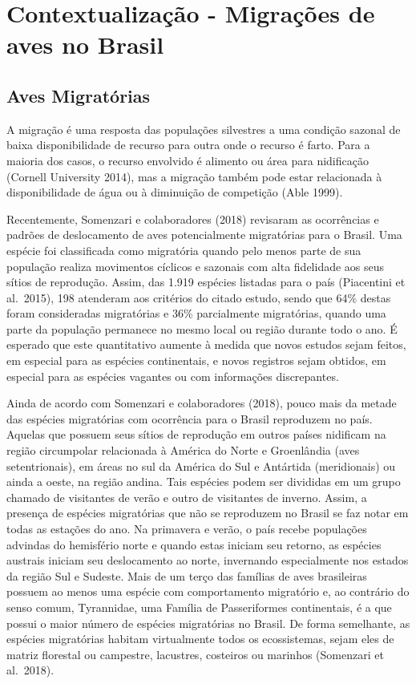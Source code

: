 \documentclass[
  oneside]{scrbook}
\begin{document}
\hypertarget{contextualizacao}{%
\section{Contextualização - Migrações de aves no Brasil}\label{contextualizacao}}

\hypertarget{aves-migratorias}{%
\subsection{Aves Migratórias}\label{aves-migratorias}}

A migração é uma resposta das populações silvestres a uma condição sazonal de baixa disponibilidade de recurso para outra onde o recurso é farto. Para a maioria dos casos, o recurso envolvido é alimento ou área para nidificação (Cornell University 2014), mas a migração também pode estar relacionada à disponibilidade de água ou à diminuição de competição (Able 1999).

Recentemente, Somenzari e colaboradores (2018) revisaram as ocorrências e padrões de deslocamento de aves potencialmente migratórias para o Brasil. Uma espécie foi classificada como migratória quando pelo menos parte de sua população realiza movimentos cíclicos e sazonais com alta fidelidade aos seus sítios de reprodução. Assim, das 1.919 espécies listadas para o país (Piacentini et al.~2015), 198 atenderam aos critérios do citado estudo, sendo que 64\% destas foram consideradas migratórias e 36\% parcialmente migratórias, quando uma parte da população permanece no mesmo local ou região durante todo o ano. É esperado que este quantitativo aumente à medida que novos estudos sejam feitos, em especial para as espécies continentais, e novos registros sejam obtidos, em especial para as espécies vagantes ou com informações discrepantes.

Ainda de acordo com Somenzari e colaboradores (2018), pouco mais da metade das espécies migratórias com ocorrência para o Brasil reproduzem no país. Aquelas que possuem seus sítios de reprodução em outros países nidificam na região circumpolar relacionada à América do Norte e Groenlândia (aves setentrionais), em áreas no sul da América do Sul e Antártida (meridionais) ou ainda a oeste, na região andina. Tais espécies podem ser divididas em um grupo chamado de visitantes de verão e outro de visitantes de inverno. Assim, a presença de espécies migratórias que não se reproduzem no Brasil se faz notar em todas as estações do ano. Na primavera e verão, o país recebe populações advindas do hemisfério norte e quando estas iniciam seu retorno, as espécies austrais iniciam seu deslocamento ao norte, invernando especialmente nos estados da região Sul e Sudeste. Mais de um terço das famílias de aves brasileiras possuem ao menos uma espécie com comportamento migratório e, ao contrário do senso comum, Tyrannidae, uma Família de Passeriformes continentais, é a que possui o maior número de espécies migratórias no Brasil. De forma semelhante, as espécies migratórias habitam virtualmente todos os ecossistemas, sejam eles de matriz florestal ou campestre, lacustres, costeiros ou marinhos (Somenzari et al.~2018).
\end{document}
